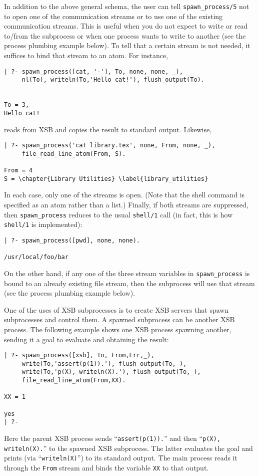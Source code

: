 In addition to the above general schema, the user can tell
\verb|spawn_process/5| not to open one of the communication streams or to
use one of the existing communication streams.  This is useful when
you do not expect to write or read to/from the subprocess or when one
process wants to write to another (see the process plumbing example
below).
%
To tell that a certain stream is not needed, it suffices to bind that
stream to an atom.  For instance,
\begin{verbatim}
| ?- spawn_process([cat, '-'], To, none, none, _),
     nl(To), writeln(To,'Hello cat!'), flush_output(To).


To = 3,
Hello cat!
\end{verbatim}
reads from XSB and copies the result to standard output. Likewise,
\begin{verbatim}
| ?- spawn_process('cat library.tex', none, From, none, _),
     file_read_line_atom(From, S).

From = 4
S = \chapter{Library Utilities} \label{library_utilities}
\end{verbatim}
In each case, only one of the streams is open. (Note that the shell
command is specified as an atom rather than a list.) Finally, if both
streams are suppressed, then \verb|spawn_process| reduces to the usual
{\tt shell/1} call (in fact, this is how {\tt shell/1} is
implemented):
\begin{verbatim}
| ?- spawn_process([pwd], none, none).

/usr/local/foo/bar
\end{verbatim}
On the other hand, if any one of the three stream variables in
\verb|spawn_process| is bound to an already existing file stream, then the
subprocess will use that stream (see the process plumbing example
below).

One of the uses of XSB subprocesses is to create XSB servers that spawn
subprocesses and control them. A spawned subprocess can be another XSB
process. The following example shows one XSB process spawning another,
sending it a goal to evaluate and obtaining the result:
\begin{verbatim}
| ?- spawn_process([xsb], To, From,Err,_),
     write(To,'assert(p(1)).'), flush_output(To,_),
     write(To,'p(X), writeln(X).'), flush_output(To,_), 
     file_read_line_atom(From,XX).  

XX = 1

yes
| ?-
\end{verbatim}
Here the parent XSB process sends ``\verb|assert(p(1)).|'' and then
``\verb|p(X), writeln(X).|'' to the spawned XSB subprocess. The latter
evaluates the goal and prints (via ``\verb|writeln(X)|'') to its
standard output. The main process reads it through the {\tt From}
stream and binds the variable {\tt XX} to that output.

